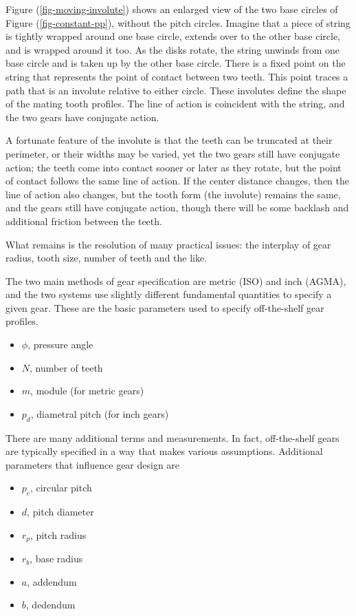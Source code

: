\documentclass[10pt]{article}
\begin{document}
Figure (\ref{fig-moving-involute}) shows an enlarged view of the two
base circles of Figure (\ref{fig-constant-pp}), without the pitch
circles. Imagine that a piece of string is tightly
wrapped around one base circle, extends over to the other base circle,
and is wrapped around it too. As the disks rotate, the string unwinds
from one base circle and is taken up by the other base circle. There
is a fixed point on the string that represents the point of
contact between two teeth. This point traces a path that
is an involute relative to either circle. These involutes define the
shape of the mating tooth profiles. The line of action is coincident
with the string, and the two gears have conjugate action.

A fortunate feature of the involute is that the teeth can be truncated at
their perimeter, or their widths may be varied, yet the two gears
still have conjugate action; the teeth come into contact sooner or
later as they rotate, but the point of contact follows the same line
of action. If the center distance changes, then the line of action
also changes, but the tooth form (the involute) remains the same, and
the gears still have conjugate action, though there will be some
backlash and additional friction between the teeth.

What remains is the resolution of many practical issues: the interplay
of gear radius, tooth size, number of teeth and the
like.

The two main methods of gear specification are
metric (ISO) and inch (AGMA), and the two systems use slightly different
fundamental quantities to specify a given gear. These are the basic
parameters used to specify off-the-shelf gear profiles.
\begin{small}
\begin{itemize}[itemsep=-1pt]
\item $\phi$, pressure angle
\item $N$, number of teeth
\item $m$, module (for metric gears)
\item $p_d$, diametral pitch (for inch gears)
\end{itemize}
\end{small}

There are many additional terms and measurements. In fact,
off-the-shelf gears are typically specified in a way that makes
various assumptions. Additional parameters that influence 
gear design are 
\begin{small}
\begin{itemize}[itemsep=-1pt]
\item $p_c$, circular pitch
\item $d$, pitch diameter
\item $r_p$, pitch radius
\item $r_b$, base radius
\item $a$, addendum
\item $b$, dedendum
\end{itemize}
\end{small}
\end{document}

